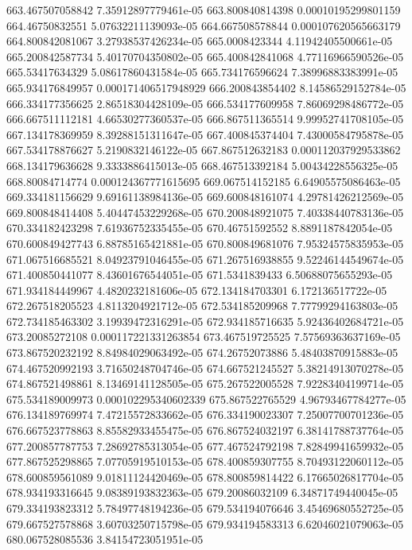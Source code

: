 {663.467507058842 7.35912897779461e-05
663.800840814398 0.00010195299801159
664.46750832551 5.07632211139093e-05
664.667508578844 0.000107620565663179
664.800842081067 3.27938537426234e-05
665.0008423344 4.11942405500661e-05
665.200842587734 5.40170704350802e-05
665.400842841068 4.77116966590526e-05
665.53417634329 5.08617860431584e-05
665.734176596624 7.38996883383991e-05
665.934176849957 0.000171406517948929
666.200843854402 8.14586529152784e-05
666.334177356625 2.86518304428109e-05
666.534177609958 7.86069298486772e-05
666.667511112181 4.66530277360537e-05
666.867511365514 9.99952741708105e-05
667.134178369959 8.39288151311647e-05
667.400845374404 7.43000584795878e-05
667.534178876627 5.2190832146122e-05
667.867512632183 0.000112037929533862
668.134179636628 9.3333886415013e-05
668.467513392184 5.00434228556325e-05
668.80084714774 0.000124367771615695
669.067514152185 6.64905575086463e-05
669.334181156629 9.69161138984136e-05
669.600848161074 4.29781426212569e-05
669.800848414408 5.40447453229268e-05
670.200848921075 7.40338440783136e-05
670.334182423298 7.61936752335455e-05
670.46751592552 8.8891187842054e-05
670.600849427743 6.88785165421881e-05
670.800849681076 7.95324575835953e-05
671.067516685521 8.04923791046455e-05
671.267516938855 9.52246144549674e-05
671.400850441077 8.43601676544051e-05
671.5341839433 6.50688075655293e-05
671.934184449967 4.4820232181606e-05
672.134184703301 6.172136517722e-05
672.267518205523 4.8113204921712e-05
672.534185209968 7.77799294163803e-05
672.734185463302 3.19939472316291e-05
672.934185716635 5.92436402684721e-05
673.20085272108 0.000117221331263854
673.467519725525 7.57569363637169e-05
673.867520232192 8.84984029063492e-05
674.26752073886 5.48403870915883e-05
674.467520992193 3.71650248704746e-05
674.667521245527 5.38214913070278e-05
674.867521498861 8.13469141128505e-05
675.267522005528 7.92283404199714e-05
675.534189009973 0.000102295340602339
675.867522765529 4.96793467784277e-05
676.134189769974 7.47215572833662e-05
676.334190023307 7.25007700701236e-05
676.667523778863 8.85582933455475e-05
676.867524032197 6.38141788737764e-05
677.200857787753 7.28692785313054e-05
677.467524792198 7.82849941659932e-05
677.867525298865 7.07705919510153e-05
678.400859307755 8.70493122060112e-05
678.600859561089 9.01811124420469e-05
678.800859814422 6.17665026817704e-05
678.934193316645 9.08389193832363e-05
679.20086032109 6.34871749440045e-05
679.334193823312 5.78497748194236e-05
679.534194076646 3.45469680552725e-05
679.667527578868 3.60703250715798e-05
679.934194583313 6.62046021079063e-05
680.067528085536 3.84154723051951e-05
}
